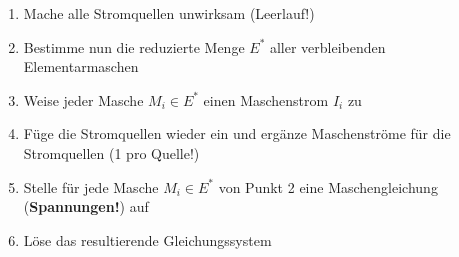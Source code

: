 					\beginip
					\begin{enumerate}
							\item Mache alle Stromquellen unwirksam (Leerlauf!)
							\item Bestimme nun die reduzierte Menge $E^*$ aller verbleibenden Elementarmaschen
							\item Weise jeder Masche $M_i \in E^*$ einen Maschenstrom $I_i$ zu
							\item Füge die Stromquellen wieder ein und ergänze Maschenströme für die Stromquellen (1 pro Quelle!)
							\item Stelle für jede Masche  $M_i \in E^*$ von Punkt 2 eine Maschengleichung (\textbf{Spannungen!}) auf
							\item Löse das resultierende Gleichungssystem
					\end{enumerate}
					\begin{center}
					\end{center}
					\iend

